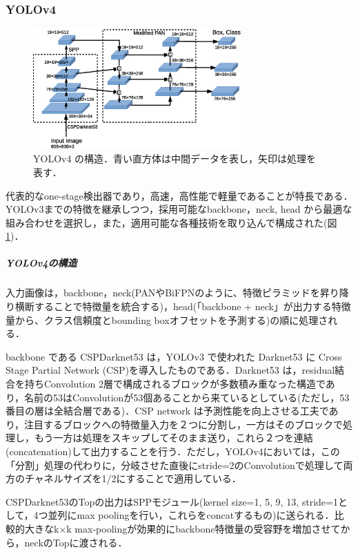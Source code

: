 \documentclass[twocolumn]{jsarticle} %
\begin{document}
\subsubsection{YOLOv4 \cite{BWL20}}
\begin{figure}[tb]
    \begin{center}
        \includegraphics[width=8cm,clip]{fig/archi_YOLOv4.eps}
    \end{center}
    \caption{ YOLOv4 の構造．青い直方体は中間データを表し，矢印は処理を表す．}
    \label{fig:archi_YOLOv4}
\end{figure}
代表的なone-stage検出器であり，高速，高性能で軽量であることが特長である．YOLOv3\cite{RedFar18}までの特徴を継承しつつ，採用可能なbackbone，neck, head から最適な組み合わせを選択し，また，適用可能な各種技術を取り込んで構成された(図\ref{fig:archi_YOLOv4})．

\subparagraph{YOLOv4の構造}入力画像は，backbone，neck(PANやBiFPNのように、特徴ピラミッドを昇り降り横断することで特徴量を統合する)，head(「backbone + neck」が出力する特徴量から、クラス信頼度とbounding boxオフセットを予測する)の順に処理される．

backbone である CSPDarknet53 は，YOLOv3 で使われた Darknet53 に Cross Stage Partial Network (CSP)を導入したものである．Darknet53 は，residual結合を持ちConvolution 2層で構成されるブロックが多数積み重なった構造であり，名前の53はConvolutionが53個あることから来ているとしている(ただし，53番目の層は全結合層である)．CSP network は予測性能を向上させる工夫であり，注目するブロックへの特徴量入力を２つに分割し，一方はそのブロックで処理し，もう一方は処理をスキップしてそのまま送り，これら２つを連結(concatenation)して出力することを行う．ただし，YOLOv4においては，この「分割」処理の代わりに，分岐させた直後にstride=2のConvolutionで処理して両方のチャネルサイズを1/2にすることで適用している．

CSPDarknet53のTopの出力はSPPモジュール(kernel size={1, 5, 9, 13}, stride=1として，4つ並列にmax poolingを行い，これらをconcatするもの)に送られる．比較的大きなk$\times$k max-poolingが効果的にbackbone特徴量の受容野を増加させてから，neckのTopに渡される．
\end{document}
